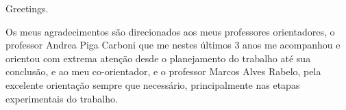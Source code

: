 


\begin{agradecimentos}

\lang
{
    Greetings.
}
{

    Os meus agradecimentos são direcionados aos meus professores orientadores, o professor Andrea Piga Carboni que me nestes
    últimos 3 anos me acompanhou e orientou com extrema atenção desde o planejamento do trabalho até sua conclusão,
    e ao meu co-orientador, e o professor Marcos Alves Rabelo, pela excelente orientação sempre que necessário, principalmente
    nas etapas experimentais do trabalho.

}

\end{agradecimentos}


%
%
%
